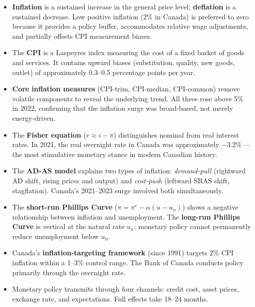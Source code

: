 \begin{itemize}
  \item \textbf{Inflation} is a sustained increase in the general price
        level; \textbf{deflation} is a sustained decrease. Low positive
        inflation (2\% in Canada) is preferred to zero because it provides
        a policy buffer, accommodates relative wage adjustments, and
        partially offsets CPI measurement biases.

  \item The \textbf{CPI} is a Laspeyres index measuring the cost of a
        fixed basket of goods and services. It contains upward biases
        (substitution, quality, new goods, outlet) of approximately
        0.3--0.5 percentage points per year.

  \item \textbf{Core inflation measures} (CPI-trim, CPI-median, CPI-common)
        remove volatile components to reveal the underlying trend. All three
        rose above 5\% in 2022, confirming that the inflation surge was
        broad-based, not merely energy-driven.

  \item The \textbf{Fisher equation} ($r \approx i - \pi$) distinguishes
        nominal from real interest rates. In 2021, the real overnight
        rate in Canada was approximately $-3.2\%$ --- the most stimulative
        monetary stance in modern Canadian history.

  \item The \textbf{AD-AS model} explains two types of inflation:
        \textit{demand-pull} (rightward AD shift, rising prices and output)
        and \textit{cost-push} (leftward SRAS shift, stagflation). Canada's
        2021--2023 surge involved both simultaneously.

  \item The \textbf{short-run Phillips Curve} ($\pi = \pi^e - \alpha(u-u_n)$)
        shows a negative relationship between inflation and unemployment.
        The \textbf{long-run Phillips Curve} is vertical at the natural
        rate $u_n$: monetary policy cannot permanently reduce unemployment
        below $u_n$.

  \item Canada's \textbf{inflation-targeting framework} (since 1991) targets
        2\% CPI inflation within a 1--3\% control range. The Bank of Canada
        conducts policy primarily through the overnight rate.

  \item Monetary policy transmits through four channels: credit cost, asset
        prices, exchange rate, and expectations. Full effects take
        18--24 months.


\end{itemize}
